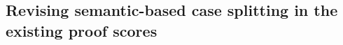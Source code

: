 \documentclass[a4paper,fleqn]{cas-dc}
\begin{document}


\subsection{Revising semantic-based case splitting in the existing proof scores} \label{semantic}
\end{document}
